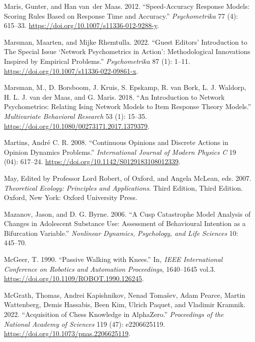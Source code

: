 \documentclass[
  letterpaper,
]{scrbook}
\newlength{\cslhangindent}
\newlength{\cslentryspacingunit} %
\newenvironment{CSLReferences}[2] %
 {%
  \setlength{\parindent}{0pt}
  \ifodd #1
  \let\oldpar\par
  \def\par{\hangindent=\cslhangindent\oldpar}
  \fi
  \setlength{\parskip}{#2\cslentryspacingunit}
 }%
 {}
\begin{document}
\begin{CSLReferences}{1}{0}
\leavevmode{}%
Maris, Gunter, and Han van~der Maas. 2012. {``Speed-Accuracy Response
Models: {Scoring} Rules Based on Response Time and Accuracy.''}
\emph{Psychometrika} 77 (4): 615--33.
\url{https://doi.org/10.1007/s11336-012-9288-y}.

\leavevmode{}%
Marsman, Maarten, and Mijke Rhemtulla. 2022. {``Guest {Editors}'
{Introduction} to {The Special Issue} {`{Network Psychometrics} in
{Action}'}: {Methodological Innovations Inspired} by {Empirical
Problems}.''} \emph{Psychometrika} 87 (1): 1--11.
\url{https://doi.org/10.1007/s11336-022-09861-x}.

\leavevmode{}%
Marsman, M., D. Borsboom, J. Kruis, S. Epskamp, R. van Bork, L. J.
Waldorp, H. L. J. van der Maas, and G. Maris. 2018. {``An Introduction
to Network Psychometrics: Relating Ising Network Models to Item Response
Theory Models.''} \emph{Multivariate Behavioral Research} 53 (1):
15--35. \url{https://doi.org/10.1080/00273171.2017.1379379}.

\leavevmode{}%
Martins, André C. R. 2008. {``Continuous Opinions and Discrete Actions
in Opinion Dynamics Problems.''} \emph{International Journal of Modern
Physics C} 19 (04): 617--24.
\url{https://doi.org/10.1142/S0129183108012339}.

\leavevmode{}%
May, Edited by Professor Lord Robert, of Oxford, and Angela McLean, eds.
2007. \emph{Theoretical {Ecology}: {Principles} and {Applications}}.
Third Edition, Third Edition. {Oxford, New York}: {Oxford University
Press}.

\leavevmode{}%
Mazanov, Jason, and D. G. Byrne. 2006. {``A {Cusp Catastrophe Model
Analysis} of {Changes} in {Adolescent Substance Use}: {Assessment} of
{Behavioural Intention} as a {Bifurcation Variable}.''} \emph{Nonlinear
Dynamics, Psychology, and Life Sciences} 10: 445--70.

\leavevmode{}%
McGeer, T. 1990. {``Passive Walking with Knees.''} In\emph{, {IEEE
International Conference} on {Robotics} and {Automation Proceedings}},
1640--1645 vol.3. \url{https://doi.org/10.1109/ROBOT.1990.126245}.

\leavevmode{}%
McGrath, Thomas, Andrei Kapishnikov, Nenad Tomašev, Adam Pearce, Martin
Wattenberg, Demis Hassabis, Been Kim, Ulrich Paquet, and Vladimir
Kramnik. 2022. {``Acquisition of Chess Knowledge in {AlphaZero}.''}
\emph{Proceedings of the National Academy of Sciences} 119 (47):
e2206625119. \url{https://doi.org/10.1073/pnas.2206625119}.


\end{CSLReferences}
\end{document}
